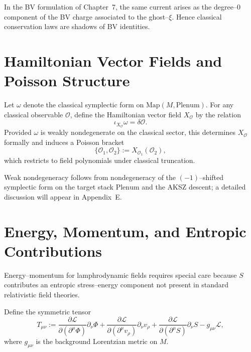 \begin{remark}
In the BV formulation of Chapter~7, the same current arises as the
degree--$0$ component of the BV charge associated to the ghost--$\xi$.
Hence classical conservation laws are shadows of BV identities.
\end{remark}



\section{Hamiltonian Vector Fields and Poisson Structure}
\label{sec:ham-vfields}

Let $\omega$ denote the classical symplectic form on
$\mathrm{Map}(M,\mathrm{Plenum})$.
For any classical observable $\mathcal{O}$, define the Hamiltonian
vector field $X_{\mathcal{O}}$ by the relation
\[
\iota_{X_{\mathcal{O}}}\omega = \delta\mathcal{O}.
\]
Provided $\omega$ is weakly nondegenerate on the classical sector,
this determines $X_{\mathcal{O}}$ formally and induces a Poisson
bracket
\[
\{\mathcal{O}_{1},\mathcal{O}_{2}\}
:= X_{\mathcal{O}_{1}}(\mathcal{O}_{2}),
\]
which restricts to field polynomials under classical truncation.

\begin{remark}
Weak nondegeneracy follows from nondegeneracy of the $(-1)$--shifted
symplectic form on the target stack $\mathrm{Plenum}$ and the AKSZ
descent; a detailed discussion will appear in Appendix~E.
\end{remark}



\section{Energy, Momentum, and Entropic Contributions}
\label{sec:energy-momentum}

Energy--momentum for lamphrodynamic fields requires special care
because $S$ contributes an entropic stress--energy component not
present in standard relativistic field theories.

\begin{definition}
\label{def:stress}
Define the symmetric tensor
\[
T_{\mu\nu}
:=
\frac{\partial\mathcal{L}}{\partial(\partial^{\mu}\Phi)}
 \partial_{\nu}\Phi
+\frac{\partial\mathcal{L}}{\partial(\partial^{\mu}v_{\rho})}
 \partial_{\nu} v_{\rho}
+\frac{\partial\mathcal{L}}{\partial(\partial^{\mu}S)}
 \partial_{\nu}S
- g_{\mu\nu}\mathcal{L},
\]
where $g_{\mu\nu}$ is the background Lorentzian metric on $M$.
\end{definition}


